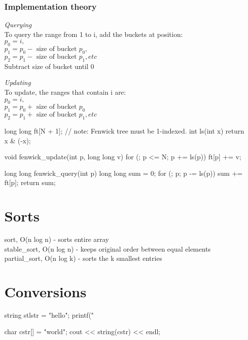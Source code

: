 \documentclass{article}
\begin{document}
\subsubsection{Implementation theory}
\textit{Querying}\\
To query the range from 1 to i, add the buckets at position:\\
\(p_0 = i,\)\\
\(p_1 = p_0 - \text{ size of bucket } p_0,\)\\
\(p_2 = p_1 - \text{ size of bucket } p_1,etc\)\\
Subtract size of bucket until 0 \newline

\textit{Updating}\\
To update, the ranges that contain i are:\\
\(p_0 = i,\)\\
\(p_1 = p_0 + \text{ size of bucket } p_0\)\\
\(p_2 = p_1 + \text{ size of bucket } p_1, etc \) \\


\begin{mylisting}{}
long long ft[N + 1]; // note: Fenwick tree must be 1-indexed.
int ls(int x) { return x & (-x); }

void fenwick_update(int p, long long v){
	for (; p <= N; p += ls(p)) ft[p] += v;
}

long long fenwick_query(int p){
	long long sum = 0;
	for (; p; p -= ls(p)) sum += ft[p];
	return sum;
}
\end{mylisting}

\section{Sorts}
sort, O(n log n)            -   sorts entire array\\
stable\_sort, O(n log n)    -   keeps original order between equal elements\\
partial\_sort, O(n log k)   -   sorts the k smallest entries

\section{Conversions}
\begin{mylisting}{}
string stlstr = "hello";
printf("%

char cstr[] = "world";
cout << string(cstr) << endl;
\end{mylisting}
\end{document}
